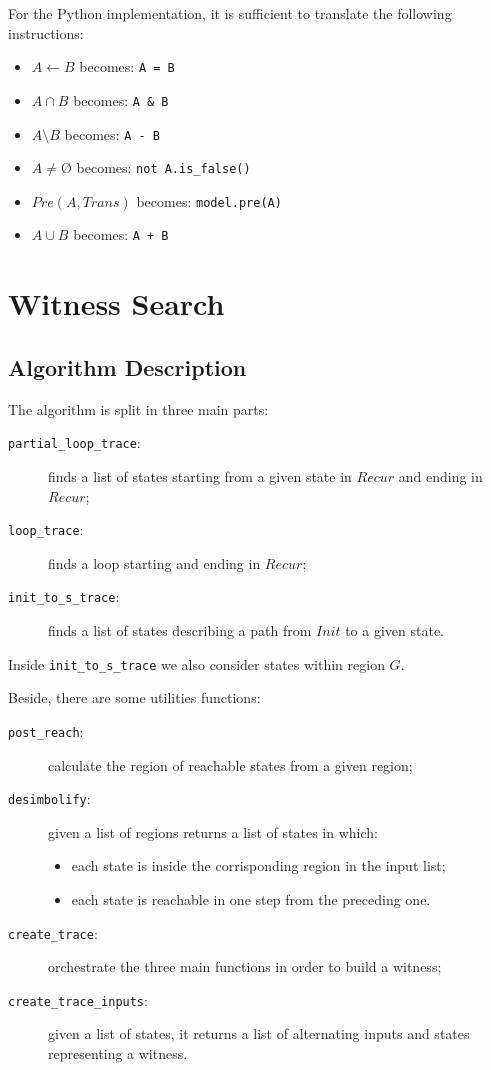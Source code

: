 \documentclass[12pt]{article}
\newcommand{\nothing}{\text{\O}}
\begin{document}
    \noindent For the Python implementation, it is sufficient to translate the following instructions:
    \begin{itemize}
        \item $A \leftarrow B$ becomes: \texttt{A = B}
        \item $A \cap B$ becomes: \texttt{A & B}
        \item $A \setminus B$ becomes: \texttt{A - B}
        \item $A \neq \nothing$ becomes: \texttt{not A.is_false()}
        \item $Pre(A, Trans)$ becomes: \texttt{model.pre(A)}
        \item $A \cup B$ becomes: \texttt{A + B}
    \end{itemize}

    \section{Witness Search}
    \subsection{Algorithm Description}
    The algorithm is split in three main parts:
    \begin{description}
        \item[\texttt{partial\_loop\_trace}:] finds a list of states starting from a given state in $Recur$ and ending in $Recur$;
        \item[\texttt{loop\_trace}:] finds a loop starting and ending in $Recur$;
        \item[\texttt{init\_to\_s\_trace}:] finds a list of states describing a path from $Init$ to a given state.
    \end{description}
    Inside \texttt{init\_to\_s\_trace} we also consider states within region $G$.

    Beside, there are some utilities functions:
    \begin{description} 
        \item[\texttt{post\_reach}:] calculate the region of reachable states from a given region;
        \item[\texttt{desimbolify}:] given a list of regions returns a list of states in which:
        \begin{itemize}
            \item each state is inside the corrisponding region in the input list;
            \item each state is reachable in one step from the preceding one.
        \end{itemize}
        \item[\texttt{create\_trace}:] orchestrate the three main functions in order to build a witness;
        \item[\texttt{create\_trace\_inputs}:] given a list of states, it returns a list of alternating inputs and states representing a witness.
    \end{description}
\end{document}
